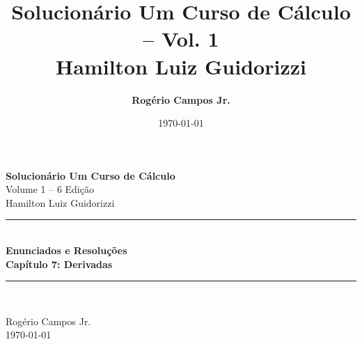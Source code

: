 \documentclass[12pt,a4paper]{article}
\title{\textbf{Solucionário Um Curso de Cálculo -- Vol. 1}\\[0.5em] \Large Hamilton Luiz Guidorizzi}
\author{\textbf{Rogério Campos Jr.}}
\date{\today}
\begin{document}
\begin{titlepage}
    \centering
    \vspace*{2cm}

    {\Huge \bfseries Solucionário Um Curso de Cálculo}\\[0.8em]
    {\LARGE Volume 1 -- 6\textordfeminine{} Edição}\\[1.5cm]

    {\Large Hamilton Luiz Guidorizzi}\\[2.5cm]

    \rule{\linewidth}{0.5mm}\\[0.4cm]
    {\huge \bfseries Enunciados e Resoluções}\\[0.2cm]
    {\Large \textbf{Capítulo 7: Derivadas}}\\[0.4cm]
    \rule{\linewidth}{0.5mm}\\[3cm]

    \vfill

    {\large Rogério Campos Jr.}\\[1cm]

    {\large \today}
\end{titlepage}

\clearpage
{}
\tableofcontents
\clearpage

\setcounter{page}{1}



% 
\end{document}
